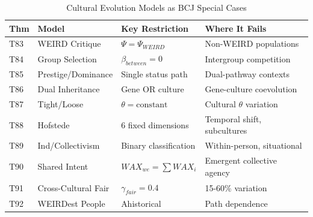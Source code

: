 \begin{table}[htbp]
\centering
\caption{Cultural Evolution Models as BCJ Special Cases}
\label{tab:cultural-boundaries}
\renewcommand{\arraystretch}{1.2}
\begin{tabular}{@{}llp{4cm}p{4cm}@{}}
\toprule
\textbf{Thm} & \textbf{Model} & \textbf{Key Restriction} & \textbf{Where It Fails} \\
\midrule
T83 & WEIRD Critique & $\Psi = \Psi_{WEIRD}$ & Non-WEIRD populations \\
T84 & Group Selection & $\beta_{between} = 0$ & Intergroup competition \\
T85 & Prestige/Dominance & Single status path & Dual-pathway contexts \\
T86 & Dual Inheritance & Gene OR culture & Gene-culture coevolution \\
T87 & Tight/Loose & $\theta = \text{constant}$ & Cultural $\theta$ variation \\
T88 & Hofstede & 6 fixed dimensions & Temporal shift, subcultures \\
T89 & Ind/Collectivism & Binary classification & Within-person, situational \\
T90 & Shared Intent & $WAX_{we} = \sum WAX_i$ & Emergent collective agency \\
T91 & Cross-Cultural Fair & $\gamma_{fair} = 0.4$ & 15-60\% variation \\
T92 & WEIRDest People & Ahistorical & Path dependence \\
\bottomrule
\end{tabular}
\end{table}

